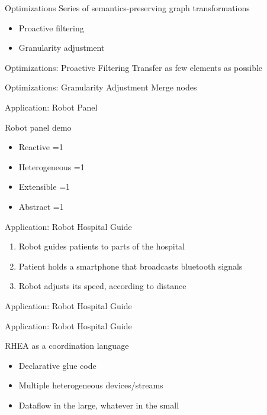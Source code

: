 \documentclass{beamer}
\newcommand{\done}{\ding{51}}
\newcommand{\checklist}[4]{
  \begin{frame}[standout]
	  \begin{itemize}
    \item Reactive \ifnum #1=1 \done \fi
    \item Heterogeneous \ifnum #2=1 \done \fi
    \item Extensible \ifnum #3=1 \done \fi
    \item Abstract \ifnum #4=1 \done \fi
    \end{itemize}
  \end{frame}
}
\begin{document}
	\begin{frame}{Optimizations}
	  Series of semantics-preserving graph transformations
	  \begin{itemize}
	  \item Proactive filtering
	  \item Granularity adjustment
	  \end{itemize}
	\end{frame}
	
	\begin{frame}{Optimizations: Proactive Filtering}
		Transfer as few elements as possible
	\end{frame}
	
	\begin{frame}{Optimizations: Granularity Adjustment}
	  Merge nodes
	\end{frame}
	
	\begin{frame}{Application: Robot Panel}
	\end{frame}
	
	\begin{frame}[standout]
	  Robot panel demo
	\end{frame}
	
	\checklist{1}{0}{0}{1}
	
	\begin{frame}{Application: Robot Hospital Guide}
	  \begin{enumerate}
	  \item Robot guides patients to parts of the hospital
	  \item Patient holds a smartphone that broadcasts bluetooth signals
	  \item Robot adjusts its speed, according to distance
	  \end{enumerate}
	\end{frame}
	\begin{frame}{Application: Robot Hospital Guide}
	\end{frame}
	\begin{frame}{Application: Robot Hospital Guide}
	\end{frame}
	
	\begin{frame}{RHEA as a coordination language}
	  \begin{itemize}
	  \item Declarative glue code
	  \item Multiple heterogeneous devices/streams
	  \item Dataflow in the large, whatever in the small
	  \end{itemize}
	\end{frame}
	
\end{document}

